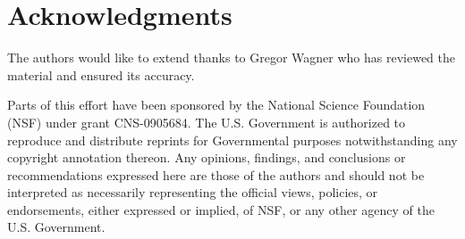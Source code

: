 \documentclass[11pt,onecolumn]{article}
\begin{document}
\section*{Acknowledgments}\label{acks}

The authors would like to extend thanks to Gregor Wagner who has reviewed the material and ensured its accuracy.

Parts of this effort have been sponsored by the National Science Foundation (NSF) under grant CNS-0905684.
The U.S. Government is authorized to reproduce and distribute reprints for Governmental purposes notwithstanding any copyright annotation thereon.
Any opinions, findings, and conclusions or recommendations expressed here are those of the authors and should not be interpreted as necessarily representing the official views, policies, or endorsements, either expressed or implied, of NSF, or any other agency of the U.S. Government.



\balance



\end{document}
